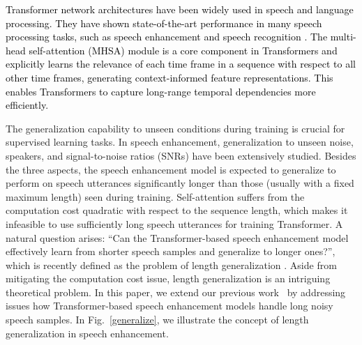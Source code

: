 \documentclass[journal]{IEEEtran}
\newcommand{\qian}[1]{{\color{magenta}#1}}
\begin{document}
\textcolor{black}{Transformer network architectures have been widely used in speech and language processing. %
They have shown state-of-the-art performance in many speech processing tasks, such as speech enhancement \cite{cleanunet,mhanet,restcnsa,tgsa,zhao2020,ripple} and speech recognition \cite{conformer-asr}. The multi-head self-attention (MHSA) module is a core component in Transformers and explicitly learns the relevance of each time frame in a sequence with respect to all other time frames, generating context-informed feature representations. This enables Transformers to capture long-range temporal dependencies more efficiently.}

The generalization capability to unseen conditions during training is crucial for supervised learning tasks. In speech enhancement, generalization to unseen noise, speakers, and signal-to-noise ratios (SNRs) have been extensively studied. Besides the three aspects, the speech enhancement model is expected to generalize to perform on speech utterances significantly longer than those (usually with a fixed maximum length) seen during training. Self-attention suffers from the computation cost quadratic with respect to the sequence length, which makes it infeasible to use sufficiently long speech utterances for training Transformer. A natural question arises: ``Can the Transformer-based speech enhancement model effectively learn from shorter speech samples and generalize to longer ones?'', which is recently defined as the problem of length generalization \cite{anil2022exploring}. Aside from mitigating the computation cost issue, length generalization is an intriguing theoretical problem. 
In this paper, we extend our previous work~\cite{zhang2024exploration} by addressing issues how Transformer-based speech enhancement models handle long noisy speech samples. In Fig.~\ref{generalize}, we illustrate the concept of length generalization in speech enhancement.




\end{document}

